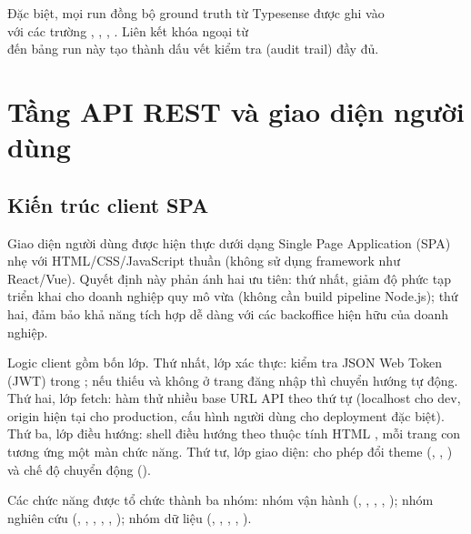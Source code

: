 Đặc biệt, mọi run đồng bộ ground truth từ Typesense được ghi vào \\  với các trường , , , . Liên kết khóa ngoại từ\\  đến bảng run này tạo thành dấu vết kiểm tra (audit trail) đầy đủ.

\section{Tầng API REST và giao diện người dùng}
\label{sec:api-ui}

\subsection{Kiến trúc client SPA}
\label{sec:spa}

Giao diện người dùng được hiện thực dưới dạng Single Page Application (SPA) nhẹ với HTML/CSS/JavaScript thuần (không sử dụng framework như React/Vue). Quyết định này phản ánh hai ưu tiên: thứ nhất, giảm độ phức tạp triển khai cho doanh nghiệp quy mô vừa (không cần build pipeline Node.js); thứ hai, đảm bảo khả năng tích hợp dễ dàng với các backoffice hiện hữu của doanh nghiệp.

Logic client gồm bốn lớp. Thứ nhất, lớp xác thực: kiểm tra JSON Web Token (JWT) trong ; nếu thiếu và không ở trang đăng nhập thì chuyển hướng tự động. Thứ hai, lớp fetch: hàm  thử nhiều base URL API theo thứ tự (localhost cho dev, origin hiện tại cho production, cấu hình người dùng cho deployment đặc biệt). Thứ ba, lớp điều hướng: shell điều hướng theo thuộc tính HTML , mỗi trang con tương ứng một màn chức năng. Thứ tư, lớp giao diện: cho phép đổi theme (, , ) và chế độ chuyển động ().

Các chức năng được tổ chức thành ba nhóm: nhóm vận hành (, , , , ); nhóm nghiên cứu (, , , , , ); nhóm dữ liệu (, , , , ).

